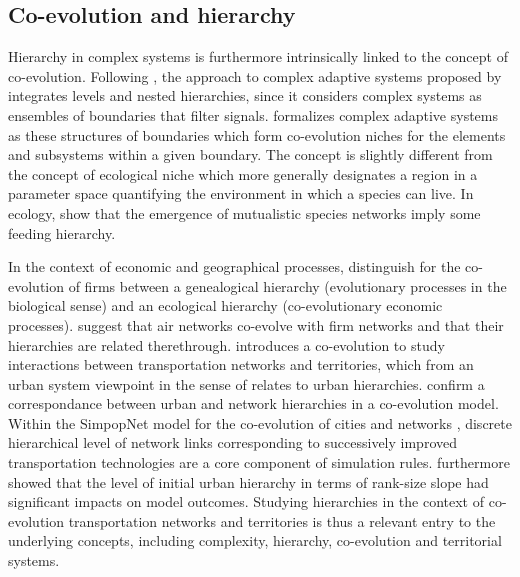 \documentclass[11pt]{article}
\begin{document}
\subsection{Co-evolution and hierarchy}



Hierarchy in complex systems is furthermore intrinsically linked to the concept of co-evolution. Following \cite{lane2006hierarchy}, the approach to complex adaptive systems proposed by \cite{holland2012signals} integrates levels and nested hierarchies, since it considers complex systems as ensembles of boundaries that filter signals. \cite{holland2012signals} formalizes complex adaptive systems as these structures of boundaries which form co-evolution niches for the elements and subsystems within a given boundary. The concept is slightly different from the concept of ecological niche which more generally designates a region in a parameter space quantifying the environment in which a species can live. In ecology, \cite{pires2011food} show that the emergence of mutualistic species networks imply some feeding hierarchy.

In the context of economic and geographical processes, \cite{volberda2003co} distinguish for the co-evolution of firms between a genealogical hierarchy (evolutionary processes in the biological sense) and an ecological hierarchy (co-evolutionary economic processes). \cite{liu2013exploring} suggest that air networks co-evolve with firm networks and that their hierarchies are related therethrough. \cite{raimbault2019modeling} introduces a co-evolution to study interactions between transportation networks and territories, which from an urban system viewpoint in the sense of \cite{pumain2006evolutionary} relates to urban hierarchies. \cite{levinson2007co} confirm a correspondance between urban and network hierarchies in a co-evolution model. Within the SimpopNet model for the co-evolution of cities and networks \citep{schmitt2014modelisation}, discrete hierarchical level of network links corresponding to successively improved transportation technologies are a core component of simulation rules. \cite{raimbault2020unveiling} furthermore showed that the level of initial urban hierarchy in terms of rank-size slope had significant impacts on model outcomes. Studying hierarchies in the context of co-evolution transportation networks and territories is thus a relevant entry to the underlying concepts, including complexity, hierarchy, co-evolution and territorial systems.
\end{document}
